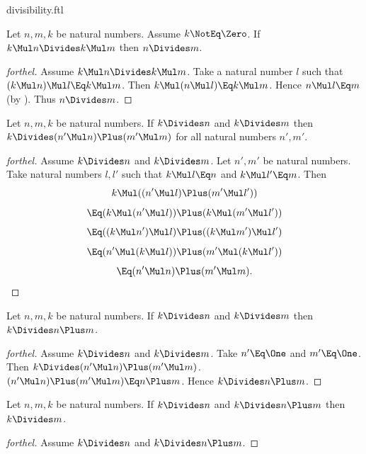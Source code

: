 \documentclass{stex}
\begin{document}
\begin{smodule}{divisibility.ftl}
\begin{proposition*}[forthel]
  Let $n, m, k$ be natural numbers.
  Assume $k \NotEq \Zero$.
  If $k \Mul n \Divides k \Mul m$ then $n \Divides m$.
\end{proposition*}
\begin{proof}[forthel]
  Assume $k \Mul n \Divides k \Mul m$.
  Take a natural number $l$ such that $(k \Mul n) \Mul l \Eq k \Mul m$.
  Then $k \Mul (n \Mul l) \Eq k \Mul m$.
  Hence $n \Mul l \Eq m$ (by ).
  Thus $n \Divides m$.
\end{proof}

\begin{proposition*}[forthel]
  Let $n, m, k$ be natural numbers.
  If $k \Divides n$ and $k \Divides m$ then $k \Divides (n' \Mul n) \Plus (m' \Mul m)$
  for all natural numbers $n', m'$.
\end{proposition*}
\begin{proof}[forthel]
  Assume $k \Divides n$ and $k \Divides m$.
  Let $n', m'$ be natural numbers.
  Take natural numbers $l,l'$ such that $k \Mul l \Eq n$ and $k \Mul l' \Eq m$.
  Then
  \[  k \Mul ((n' \Mul l) \Plus (m' \Mul l'))                \]
  \[    \Eq (k \Mul (n' \Mul l)) \Plus (k \Mul (m' \Mul l'))  \]
  \[    \Eq ((k \Mul n') \Mul l) \Plus ((k \Mul m') \Mul l')  \]
  \[    \Eq (n' \Mul (k \Mul l)) \Plus (m' \Mul (k \Mul l'))  \]
  \[    \Eq (n' \Mul n) \Plus (m' \Mul m).                      \]
\end{proof}

\begin{proposition*}[forthel]
  Let $n, m, k$ be natural numbers.
  If $k \Divides n$ and $k \Divides m$ then $k \Divides n \Plus m$.
\end{proposition*}
\begin{proof}[forthel]
  Assume $k \Divides n$ and $k \Divides m$.
  Take $n' \Eq \One$ and $m' \Eq \One$.
  Then $k \Divides (n' \Mul n) \Plus (m' \Mul m)$.
  $(n' \Mul n) \Plus (m' \Mul m) \Eq n \Plus m$.
  Hence $k \Divides n \Plus m$.
\end{proof}

\begin{proposition*}[forthel,name=divisibility of summands]
  Let $n, m, k$ be natural numbers.
  If $k \Divides n$ and $k \Divides n \Plus m$ then $k \Divides m$.
\end{proposition*}
\begin{proof}[forthel]
  Assume $k \Divides n$ and $k \Divides n \Plus m$.


\end{proof}
\end{smodule}
\end{document}
